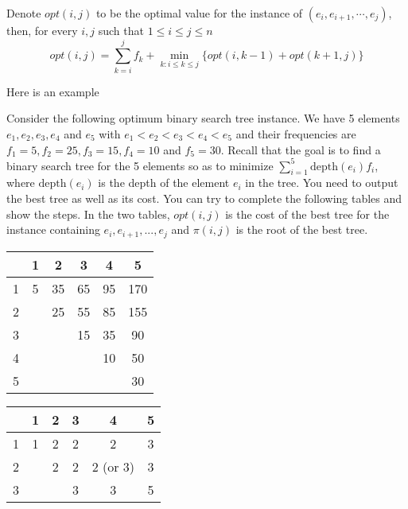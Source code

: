 						Denote $opt(i, j)$ to be the optimal value for the instance of $(e_i, e_{i + 1}, \cdots, e_j)$, then, for every $i, j$ such that $1 \le i \le j \le n$
						\begin{equation}
							opt(i, j) = \sum_{k = i}^j f_k + \min_{k:i \le k \le j}\{opt(i, k - 1) + opt(k + 1, j)\}
						\end{equation}

						Here is an example
						\begin{example}
							Consider the following optimum binary search tree instance. We have 5 elements $e_1, e_2, e_3, e_4$ and $e_5$ with $e_1 < e_2 < e_3 < e_4 < e_5$ and their frequencies are $f_1 = 5, f_2 = 25, f_3 = 15, f_4 = 10$ and $f_5 = 30$.  Recall that the goal is to find a binary search tree for the 5 elements so as to minimize $\sum_{i=1}^5 \textrm{depth}(e_i) f_i$, where $\textrm{depth}(e_i)$ is the depth of the element $e_i$ in the tree.  You need to output the best tree as well as its cost. You can try to complete the following tables and show the steps.  In the two tables, $opt(i,j)$ is the cost of the best tree for the instance containing $e_i, e_{i+1}, ..., e_j$ and $\pi(i, j)$ is the root of the best tree.
							\begin{table}[H]
								\centering
								\begin{tabular}{|c|c|c|c|c|c|}
									\hline
									\backslashbox{$i$}{$opt(i, j)$}{$j$} &  1 & 2  & 3 & 4 & 5 \\ \hline
									1 & 5 & 35 & 65 & 95 & 170\\\hline
									2&  & 25 & 55 & 85 & 155 \\\cline{1-1}\cline{3-6}
									3& \multicolumn{2}{c|}{} & 15 & 35 & 90\\\cline{1-1}\cline{4-6}
									4& \multicolumn{3}{c|}{} & 10 & 50 \\\cline{1-1}\cline{5-6}
									5& \multicolumn{4}{c|}{} & 30 \\\cline{1-1}\cline{6-6}
								\end{tabular}\qquad\qquad
								\begin{tabular}{|c|c|c|c|c|c|}
									\hline
									\backslashbox{$i$}{$\pi(i, j)$}{$j$} &  1 & 2  & 3 & 4 & 5 \\ \hline
									1 & 1 & 2 & 2 & 2 & 3\\\hline
									2&  & 2 & 2 & 2 (or 3)& 3 \\\cline{1-1}\cline{3-6}
									3& \multicolumn{2}{c|}{} & 3 & 3& 5\\\cline{1-1}\cline{4-6}

\end{tabular}
\end{table}
\end{example}
